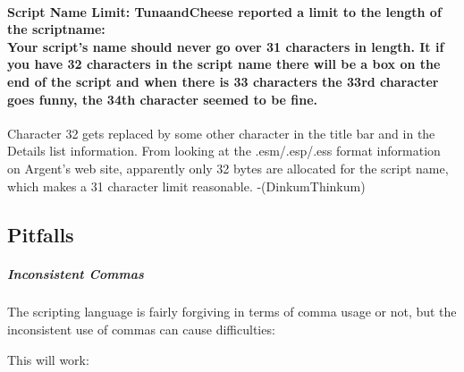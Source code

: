 \hypertarget{script-name-limit-tunaandcheese-reported-a-limit-to-the-length-of-the-scriptname-your-scripts-name-should-never-go-over-31-characters-in-length.-it-if-you-have-32-characters-in-the-script-name-there-will-be-a-box-on-the-end-of-the-script-and-when-there-is-33-characters-the-33rd-character-goes-funny-the-34th-character-seemed-to-be-fine.}{%
\paragraph{\texorpdfstring{\textbf{Script Name Limit:} TunaandCheese
reported a limit to the length of the scriptname:\\
Your script's name should never go over 31 characters in length. It if
you have 32 characters in the script name there will be a box on the end
of the script and when there is 33 characters the 33rd character goes
funny, the 34th character seemed to be
fine.}{Script Name Limit: TunaandCheese reported a limit to the length of the scriptname: Your script's name should never go over 31 characters in length. It if you have 32 characters in the script name there will be a box on the end of the script and when there is 33 characters the 33rd character goes funny, the 34th character seemed to be fine.}}\label{script-name-limit-tunaandcheese-reported-a-limit-to-the-length-of-the-scriptname-your-scripts-name-should-never-go-over-31-characters-in-length.-it-if-you-have-32-characters-in-the-script-name-there-will-be-a-box-on-the-end-of-the-script-and-when-there-is-33-characters-the-33rd-character-goes-funny-the-34th-character-seemed-to-be-fine.}}

Character 32 gets replaced by some other character in the title bar and
in the Details list information. From looking at the .esm/.esp/.ess
format information on Argent's web site, apparently only 32 bytes are
allocated for the script name, which makes a 31 character limit
reasonable. -(DinkumThinkum)

\hypertarget{pitfalls}{%
\subsection{Pitfalls}\label{pitfalls}}

\hypertarget{inconsistent-commas}{%
\subparagraph{Inconsistent Commas}\label{inconsistent-commas}}

The scripting language is fairly forgiving in terms of comma usage or
not, but the inconsistent use of commas can cause difficulties:

This will work:

